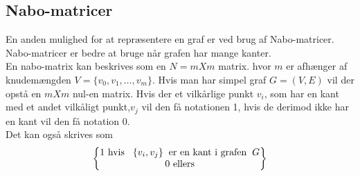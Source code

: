 \subsection{Nabo-matricer}
En anden mulighed for at repræsentere en graf er ved brug af Nabo-matricer. Nabo-matricer er bedre at bruge når grafen har mange kanter.\\
En nabo-matrix kan beskrives som en $N=m X m$ matrix. hvor $m$ er afhænger af knudemængden $V=\{v_0, v_1, \ldots, v_m\}$. Hvis man har simpel graf $G=(V,E)$ vil der opstå en $m X m$ nul-en matrix. Hvis der et vilkårlige punkt $v_i$, som har en kant med et andet vilkåligt punkt,$v_j$ vil den få notationen 1, hvis de derimod ikke har en kant vil den få notation 0. \\

Det kan også skrives som \\

\begin{equation}
\begin{Bmatrix} 
	 \textrm{1 hvis} \hspace{0.3cm}\{v_i,v_j\} \hspace{0.2cm} \textrm{er en kant i grafen} \hspace{0.2cm} G \\
	 \textrm{0 ellers} \\
	\end{Bmatrix}
\end{equation}



	

